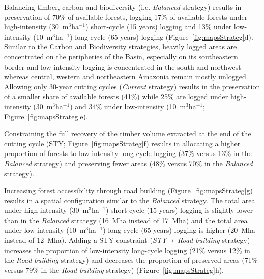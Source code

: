 \documentclass{article}
\begin{document}
Balancing timber, carbon and biodiversity (i.e. \textit{Balanced} strategy) results in preservation of 70\% of available forests, logging 17\% of available forests under high-intensity (30~m$^3$ha$^{-1}$) short-cycle (15 years) logging and 13\% under low-intensity (10~m$^3$ha$^{-1}$) long-cycle (65 years) logging (Figure~\ref{fig:mapsStrateg}d). Similar to the Carbon and Biodiversity strategies, heavily logged areas are concentrated on the peripheries of the Basin, especially on its southeastern border and  low-intensity logging is concentrated in the south and northwest whereas central, western and northeastern Amazonia remain mostly unlogged. Allowing only 30-year cutting cycles (\textit{Current} strategy) results in the preservation of a smaller share of available forests (41\%) while 25\% are logged under high-intensity (30~m$^3$ha$^{-1}$) and 34\% under low-intensity (10~m$^3$ha$^{-1}$;  Figure~\ref{fig:mapsStrateg}e). 

Constraining the full recovery of the timber volume extracted at the end of the cutting cycle (STY; Figure~\ref{fig:mapsStrateg}f) results in allocating a higher proportion of forests to low-intensity long-cycle logging (37\% versus 13\% in the \textit{Balanced} strategy)  and preserving fewer areas (48\% versus 70\% in the \textit{Balanced} strategy).

Increasing forest accessibility through road building (Figure~\ref{fig:mapsStrateg}g) results in a spatial configuration similar to the \textit{Balanced} strategy. The total area under high-intensity (30~m$^3$ha$^{-1}$) short-cycle (15 years) logging is slightly lower than in the \textit{Balanced} strategy (16~Mha instead of 17~Mha) and the total area under low-intensity (10~m$^3$ha$^{-1}$) long-cycle (65 years) logging is higher (20~Mha instead of 12~Mha). Adding a STY constraint (\textit{STY + Road building} strategy) increases the proportion of low-intensity long-cycle logging (21\% versus 12\% in the \textit{Road building} strategy) and decreases the proportion of preserved areas (71\% versus 79\% in the \textit{Road building} strategy)  (Figure~\ref{fig:mapsStrateg}h). 
\end{document}
